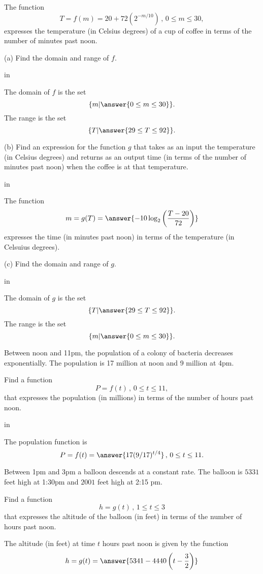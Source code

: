\documentclass{ximera}
\newcommand{\pskip}{\vskip 0.1 in}
\begin{document}
\begin{question}  \label{QDFdf4444}
The function
\[
      T = f(m) = 20 + 72 (2^{-m/10}) \, , \, 0 \leq m \leq 30 ,
\]
expresses the temperature (in Celsius degrees) of a cup of coffee in terms of the number of minutes past noon.

(a) Find the domain and range of $f$.

\pskip

The domain of $f$ is the set
\[
     \{ m | \answer{0\leq m \leq 30}   \} .
\]
The range is the set
\[
       \{ T | \answer{29\leq T \leq 92}   \} .
\]


(b) Find an expression for the function $g$ that takes as an input the temperature (in Celsius degrees)  and returns as an output time (in terms of the number of minutes past noon) when the coffee is at that temperature.

\pskip

The function 
\[
         m = g(T) = \answer{-10 \log_2 \left( \frac{T-20}{72} \right)} 
\]
expresses the time (in minutes past noon) in terms of the temperature (in Celsuius degrees).

(c) Find the domain and range of $g$.

\pskip

The domain of $g$ is the set
\[
      \{ T | \answer{29\leq T \leq 92}   \} .
\]
The range is the set
\[
    \{ m | \answer{0\leq m \leq 30}   \} .  
\]

\end{question}

\begin{question}  \label{Q87d6fgte}
Between noon and 11pm, the population of a colony of bacteria decreases exponentially. The population is 17 million at noon and 9 million at 4pm.

Find a function
\[
        P = f(t) \, , \, 0\leq t \leq 11 ,
\]
that expresses the population (in millions) in terms of the number of hours past noon.

\pskip

The population function is
\[
    P = f(t) = \answer{17(9/17)^{t/4}} \, , \, 0\leq t \leq 11 .
\]
\end{question}


\begin{question}  \label{Q98d33dg5r5r3}
Between 1pm and 3pm a balloon descends at a constant rate. The balloon is $5331$ feet high at 1:30pm and $2001$ feet high at 2:15 pm.

Find a function
\[
      h = g(t) \, , \, 1\leq t \leq 3
\]
that expresses the altitude of the balloon (in feet) in terms of the number of hours past noon.


The altitude (in feet) at time $t$ hours past noon is given by the function
\[
  h = g(t) = \answer{5341 - 4440  \left(t - \frac{3}{2}   \right)}
\]
\end{question}
\end{document}
